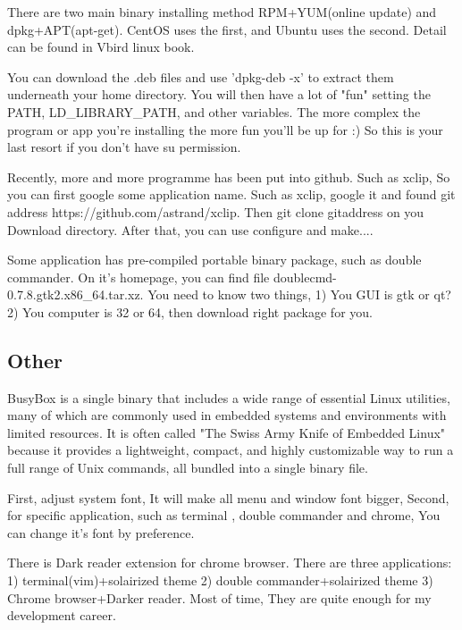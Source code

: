 \documentclass[paper=8.5in:11in, twoside, 12pt, pagesize=pdftex]{book}
\begin{document}
	\par There are two main binary installing method RPM+YUM(online update) and dpkg+APT(apt-get). CentOS uses the first, and Ubuntu uses the second. Detail can be found in Vbird linux book.

	\par You can download the .deb files and use 'dpkg-deb -x' to extract them underneath your home directory. You will then have a lot of "fun" setting the PATH, LD\_LIBRARY\_PATH, and other variables. The more complex the program or app you're installing the more fun you'll be up for :) So this is your last resort if you don't have su permission.

	\par Recently, more and more programme has been put into github. Such as xclip, So you can first google some application name. Such as xclip, google it and found git address https://github.com/astrand/xclip. Then git clone gitaddress on you Download directory. After that, you can use configure and make....

	\par Some application has pre-compiled portable binary package, such as double commander. On it's homepage, you can find file  doublecmd-0.7.8.gtk2.x86\_64.tar.xz. You need to know two things, 1) You GUI is gtk or qt? 2) You computer is 32 or 64, then download right package for you.

\subsection{Other}

	\par BusyBox is a single binary that includes a wide range of essential Linux utilities, many of which are commonly used in embedded systems and environments with limited resources. It is often called "The Swiss Army Knife of Embedded Linux" because it provides a lightweight, compact, and highly customizable way to run a full range of Unix commands, all bundled into a single binary file.
	
	\par First, adjust system font, It will make all menu and window font bigger, Second, for specific application, such as terminal , double commander and chrome, You can change it's font by preference. 

	\par There is Dark reader extension for chrome browser. There are three applications: 1) terminal(vim)+solairized theme 2) double commander+solairized theme 3) Chrome browser+Darker reader. Most of time, They are quite enough for my development career. 
\end{document}
